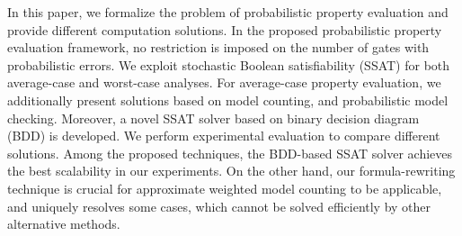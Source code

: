     In this paper, we formalize the problem of probabilistic property evaluation and provide different computation solutions.
    In the proposed probabilistic property evaluation framework, no restriction is imposed on the number of gates with probabilistic errors.
    We exploit stochastic Boolean satisfiability (SSAT) for both average-case and worst-case analyses.
    For average-case property evaluation, we additionally present solutions based on model counting, and probabilistic model checking.
    Moreover, a novel SSAT solver based on binary decision diagram (BDD) is developed.
    We perform experimental evaluation to compare different solutions.
    Among the proposed techniques, the BDD-based SSAT solver achieves the best scalability in our experiments.
    On the other hand, our formula-rewriting technique is crucial for approximate weighted model counting to be applicable, and uniquely resolves some cases, which cannot be solved efficiently by other alternative methods.
\fi